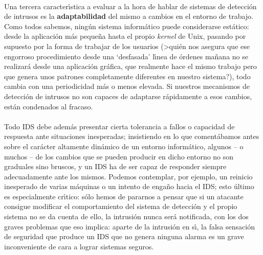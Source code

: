 \\Una tercera caracter\'{\i}stica a evaluar a la hora de hablar de sistemas de
detecci\'on de intrusos es la {\bf adaptabilidad} del mismo a cambios en el 
entorno de trabajo. Como todos sabemos, ning\'un sistema inform\'atico puede
considerarse est\'atico: desde la aplicaci\'on m\'as peque\~na hasta el
propio {\it kernel} de Unix, pasando por supuesto por la forma de trabajar de
los usuarios (>qui\'en nos asegura que ese engorroso procedimiento desde una
`desfasada' l\'{\i}nea de \'ordenes ma\~nana no se realizar\'a desde una 
aplicaci\'on gr\'afica, que realmente hace el mismo trabajo pero que genera
unos patrones completamente diferentes en nuestro sistema?), todo cambia 
con una periodicidad m\'as o menos elevada. Si nuestros mecanismos de 
detecci\'on de intrusos no son capaces de adaptarse r\'apidamente a esos 
cambios, est\'an condenados al fracaso.\\
\\Todo IDS debe adem\'as presentar cierta tolerancia a fallos o capacidad de 
respuesta ante situaciones inesperadas; insistiendo en lo que coment\'abamos
antes sobre el car\'acter altamente din\'amico de un entorno inform\'atico, 
algunos -- o muchos -- de los cambios que se pueden producir en dicho entorno 
no son graduales sino bruscos, y un IDS ha de ser capaz de responder siempre
adecuadamente ante los mismos. Podemos contemplar, por ejemplo, un reinicio 
inesperado de varias m\'aquinas o un intento de 
enga\~no hacia el IDS; esto \'ultimo es especialmente cr\'{\i}tico: s\'olo 
hemos de pararnos a pensar que si un atacante consigue modificar el 
comportamiento del sistema de detecci\'on y el propio sistema no se da cuenta 
de ello, la intrusi\'on nunca ser\'a notificada, con los dos graves problemas
que eso implica: aparte de la intrusi\'on en s\'{\i}, la falsa sensaci\'on de
seguridad que produce un IDS que no genera ninguna alarma es un grave 
inconveniente de cara a lograr sistemas seguros.

